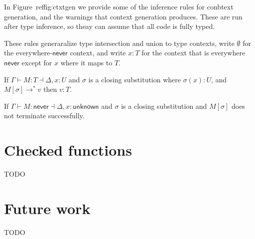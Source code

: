 \documentclass[sigplan]{acmart}
\newcommand{\NEVER}{\mathsf{never}}
\newcommand{\UNKNOWN}{\mathsf{unknown}}
\begin{document}
In Figure~ref{fig:ctxtgen} we provide some of the inference rules for
conbtext generation, and the warnings that context generation produces.
These are run after type inference, so theay can assume that all code is fully typed.

These rules generaralize type intersection and union to type contexts,
write $\emptyset$ for the everywhere-$\NEVER$ context, and write $x:T$
for the context that is everywhere $\NEVER$ except for $x$ where it
maps to $T$.

\begin{conjecture}
If $\Gamma \vdash M : T \dashv \Delta, x:U$ and $\sigma$ is a closing
substitution where $\sigma(x) : U$, and $M[\sigma] \rightarrow^* v$
then $v : T$.
\end{conjecture}

\begin{corollary}
If $\Gamma \vdash M : \NEVER \dashv \Delta, x:\UNKNOWN$ and $\sigma$ is a closing
substitution and $M[\sigma]$ does not terminate successfully.
\end{corollary}

\section{Checked functions}

TODO

\section{Future work}

TODO

 
\end{document}
